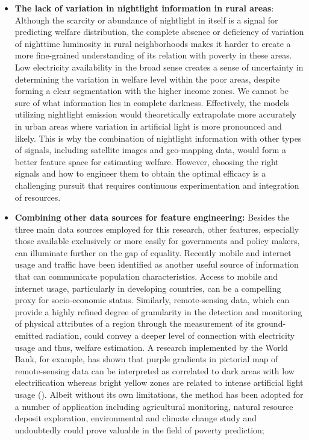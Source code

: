 \documentclass[solid,math,chem,code,plot,gloss]{bmc}
\begin{document}
\begin{itemize}
    \item \textbf{The lack of variation in nightlight information in rural areas}: Although the scarcity or abundance of nightlight in itself is a signal for predicting welfare distribution, the complete absence or deficiency of variation of nighttime luminosity in rural neighborhoods makes it harder to create a more fine-grained understanding of its relation with poverty in these areas. Low electricity availability in the broad sense creates a sense of uncertainty in determining the variation in welfare level within the poor areas, despite forming a clear segmentation with the higher income zones. We cannot be sure of what information lies in complete darkness. Effectively, the models utilizing nightlight emission would theoretically extrapolate more accurately in urban areas where variation in artificial light is more pronounced and likely. This is why the combination of nightlight information with other types of signals, including satellite images and geo-mapping data, would form a better feature space for estimating welfare. However, choosing the right signals and how to engineer them to obtain the optimal efficacy is a challenging pursuit that requires continuous experimentation and integration of resources. 


    \item \textbf{Combining other data sources for feature engineering:} Besides the three main data sources employed for this research, other features, especially those available exclusively or more easily for governments and policy makers, can illuminate further on the gap of equality. Recently mobile and internet usage and traffic have been identified as another useful source of information that can communicate population characteristics. Access to mobile and internet usage, particularly in developing countries, can be a compelling proxy for socio-economic status. Similarly, remote-sensing data, which can provide a highly refined degree of granularity in the detection and monitoring of physical attributes of a region through the measurement of its ground-emitted radiation, could convey a deeper level of connection with electricity usage and thus, welfare estimation. A research implemented by the World Bank, for example, has shown that purple gradients in pictorial map of remote-sensing data can be interpreted as correlated to dark areas with low electrification whereas bright yellow zones are related to intense artificial light usage (\cite{IFC_2019}). Albeit without its own limitations, the method has been adopted for a number of application including agricultural monitoring, natural resource deposit exploration, environmental and climate change study and undoubtedly could prove valuable in the field of poverty prediction; 
    

\end{itemize}
\end{document}
